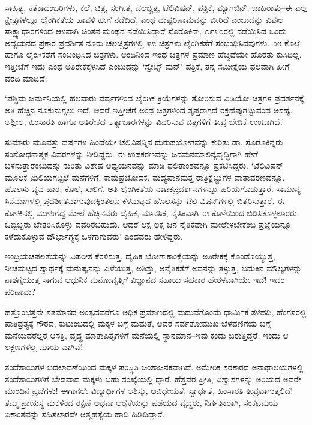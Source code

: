 ಸಾಹಿತ್ಯ, ಕತೆಕಾದಂಬರಿಗಳು, ಕಲೆ, ಚಿತ್ರ, ಸಂಗೀತ, ಚಲಚ್ಚಿತ್ರ, ಟೆಲಿವಿಷನ್, ಪತ್ರಿಕೆ, ಮ್ಯಾಗಜಿನ್, ಜಾಹಿರಾತು–ಈ ಎಲ್ಲ ಕ್ಷೇತ್ರಗಳಲ್ಲೂ ಲೈಂಗಿಕತೆಯ ಹಾವಳಿ ಹೇಗೆ ನಡೆದಿದೆ, ಎಂಥ ದುಷ್ಪರಿಣಾಮವನ್ನು ಬೀರಿದೆ ಎಂಬುದನ್ನು ವಿಪುಲ ಸಾಕ್ಷ್ಯಾಧಾರಗಳಿಂದ ಆಳವಾಗಿ ಚಿಂತನ ಮಂಥನ ನಡೆಯಿಸಿದ್ದಾರೆ ಸೊರೊಕಿನ್. ೧೯೩೦ರಲ್ಲಿ ನಡೆಯಿಸಿದ ಒಂದು ಅಧ್ಯಯನದ ಪ್ರಕಾರ ಪ್ರದರ್ಶಿತ ನೂರು ಚಲಚ್ಚಿತ್ರಗಳಲ್ಲಿ ೪೫ ಚಿತ್ರಗಳು ಲೈಂಗಿಕತೆಗೆ ಸಂಬಂಧಿಸಿದವುಗಳು. ೨೮ ಕೊಲೆ ಹಾಗೂ ಲೈಂಗಿಕತೆಗೆ ಸಂಬಂಧಿಸಿದ ಚಿತ್ರಗಳು. ಅಂದಿನಿಂದ ಇಂಥ ಚಿತ್ರಗಳ ಪ್ರಮಾಣ ಹೆಚ್ಚಿದೆಯೇ ಹೊರತು ಕುಸಿದಿಲ್ಲ. ಇತ್ತೀಚೆಗೆ ಇದು ಎಂಥ ಅತಿರೇಕಕ್ಕೆಳಸಿದೆ ಎಂಬುದನ್ನು ‘ಸ್ವೇಟ್ಸ್ ಮನ್​’ ಪತ್ರಿಕೆ, ತನ್ನ ಸಮೀಕ್ಷೆಯ ಫಲವಾಗಿ ಹೀಗೆ ವರದಿ ಮಾಡಿದೆ:

‘ಪಶ್ಚಿಮ ಜರ್ಮನಿಯಲ್ಲಿ ಹಲವಾರು ವರ್ಷಗಳಿಂದ ಲೈಂಗಿಕ ಕ್ರಿಯೆಗಳನ್ನು ತೋರಿಸುವ ವಿಡಿಯೋ ಚಿತ್ರಗಳ ಪ್ರದರ್ಶನಕ್ಕೆ ಅತಿ ಹೆಚ್ಚಿನ ನೂಕುನುಗ್ಗಲು ಇದೆ. ಆದರೆ ಇತ್ತೀಚೆಗೆ ಅಂಥ ಚಿತ್ರಗಳಿಂದ ತೃಪ್ತರಾಗದೆ ರಕ್ತಹೆಪ್ಪುಗಟ್ಟುವಂಥ ಅಸಹ್ಯ, ಅಶ್ಲೀಲ, ಹಿಂಸಾರತಿ ಹಾಗೂ ಅತಿರೇಕದ ಅತ್ಯಾಚಾರಗಳನ್ನು ವಿವರಿಸುವ ಚಿತ್ರಗಳಿಗೆ ತೀವ್ರ ಬೇಡಿಕೆ ಉಂಟಾಗಿದೆ.’

ಸುಮಾರು ಮೂವತ್ತು ವರ್ಷಗಳ ಹಿಂದೆಯೇ ಟೆಲಿವಿಷನ್ನಿನ ದುರುಪಯೋಗವನ್ನು ಕುರಿತು ಡಾ. ಸೊರೊಕಿನ್ನರು ಸಂಶೋಧನಾತ್ಮಕ ವಿವರಗಳನ್ನು ನೀಡಿದ್ದರು. ಈ ಉಪಕರಣವನ್ನು ಜನಮನಮಾಲಿನ್ಯವೃದ್ಧಿಗಾಗಿ ಹೇಗೆ ಬಳಸುತ್ತಾರೆಂಬುದನ್ನು ಕುರಿತು ವಿಶೇಷ ಅಧ್ಯಯನವನ್ನು ಮಾಡಿ ಫಲಿತಾಂಶವನ್ನೂ ಪ್ರಕಟಿಸಿದ್ದರು. ‘ಟೆಲಿವಿಷನ್ ಮೂಲಕ ಮಿಲಿಯಗಟ್ಟಲೆ ಮನೆಗಳಿಗೆ, ಕಾಮಪ್ರಚೋದಕ, ಮದ್ಯಪಾನಮತ್ತ ರಾತ್ರಿಕ್ಲಬ್ಬುಗಳ ವಾತಾವರಣವನ್ನೂ, ಹೊಲಸು ವ್ಯವ ಹಾರ, ಕೊಲೆ, ಸುಲಿಗೆ, ಅತಿ ಲೈಂಗಿಕತೆಯ ನಾಟಕಪ್ರದರ್ಶನಗಳನ್ನೂ ಹರಿಯಗೊಡುತ್ತಾರೆ. ಸಾಮಾನ್ಯ ಸಿನೆಮಾಗಳಲ್ಲಿ ಪ್ರದರ್ಶಿತವಾಗುವುದಕ್ಕಿಂತಲೂ ಕೆಳಮಟ್ಟದ ಹೊಲಸನ್ನು ಟೆಲಿ ವಿಷನ್​ಗಳಲ್ಲಿ ಬಿತ್ತರಿಸುತ್ತಾರೆ. ಈ ಕೊಳಕಿನಲ್ಲಿ ಮುಳುಗೆದ್ದ ಮೇಲೆ ಹೆಚ್ಚಿನವರು ದೈಹಿಕ, ಮಾನಸಿಕ, ನೈತಿಕವಾಗಿ ಈ ಕೊಳೆಯಿಂದ ಬಿಡಿಸಿಕೊಳ್ಳಲಾರರು. ಒಬ್ಬಿಬ್ಬರು ಚೇತರಿಸಿಕೊಳ್ಳು ವವರಿರಬಹುದು. ಆದರೆ ಲಕ್ಷ ಲಕ್ಷ ಜನ ನೈತಿಕವಾಗಿ ಮೇಲೇಳಬೇಕೆಂಬ ಪ್ರಜ್ಞೆಯನ್ನೂ ಕಳೆದುಕೊಳ್ಳುವ ದೌರ್ಭಾಗ್ಯಕ್ಕೆ ಒಳಗಾಗುವರು’ ಎಂದವರು ಹೇಳಿದ್ದರು.

ಇಂದ್ರಿಯಚಪಲತೆಯನ್ನು ವಿಪರೀತ ಕೆರಳಿಸುತ್ತ, ದೈಹಿಕ ಭೋಗಾಕಾಂಕ್ಷೆಯನ್ನು ಅತಿರೇಕಕ್ಕೆ ಕೊಂಡೊಯ್ಯುತ್ತ, ನೀಚಮಟ್ಟದ ಸ್ವಾರ್ಥಕ್ಕೆ ಮನುಷ್ಯನನ್ನು ಎಳೆಯುತ್ತ, ಅಶಿಸ್ತು, ಅನೈತಿಕತೆಗೆ ಅವನನ್ನು ತಳ್ಳುತ್ತ, ಬದುಕಿನ ಮೌಲ್ಯಗಳನ್ನು ನಾಶಗೈಯುತ್ತ ಸಾಗುವ ಆಧುನಿಕ ಮನೋವೃತ್ತಿಗೆ ವಿಜ್ಞಾನದ ಸಹಾಯ ಸಹಕಾರ ಹೇರಳವಾಗಿಯೇ ಇದೆ! ಇದರ ಪರಿಣಾಮ?

ಹತ್ತೊಂಭತ್ತನೇ ಶತಮಾನದ ಅಂತ್ಯದವರೆಗೂ ಅಧಿಕ ಪ್ರಮಾಣದಲ್ಲಿ ಮದುವೆಗೊಂದು ಧಾರ್ಮಿಕ ತಳಹದಿ, ಹೆಂಗಸರಲ್ಲಿ ಪಾತಿವ್ರತ್ಯಕ್ಕೆ ಗೌರವ, ಕುಟುಂಬದಲ್ಲಿ ಮಕ್ಕಳ ಬಗ್ಗೆ ಮಮತೆ, ಅವರ ಸರ್ವತೋಮುಖ ಬೆಳವಣಿಗೆಯ ಬಗ್ಗೆ ಮನೆಯವರೆಲ್ಲರ ಆಸಕ್ತಿ, ವೃದ್ಧ ಮಾತಾಪಿತೃಗಳಿಗೆ ಮನೆಯಲ್ಲಿ ಸ್ಥಾನಮಾನ–ಇವು ಕಂಡು ಬರುತ್ತಿದ್ದರೆ, ಇಂದು ಆ ಲಕ್ಷಣಗಳೆಲ್ಲ ಮಾಯ ವಾಗಿವೆ!

ತಂದೆತಾಯಿಗಳ ಬದಲಾವಣೆಯಿಂದ ಮಕ್ಕಳ ಪರಿಸ್ಥಿತಿ ಚಿಂತಾಜನಕವಾಗಿದೆ. ಅಮೇರಿಕ ಸರಕಾರದ ಅನಾಥಾಲಯಗಳಲ್ಲಿ ತಂದೆತಾಯಿಗಳಿಗೆ ಬೇಡವಾದ ಮಕ್ಕಳು ಬಹು ಸಂಖ್ಯೆಯಲ್ಲಿ ದ್ದಾರೆ. ಹೆತ್ತವರ ಪ್ರೀತಿ, ವಿಶ್ವಾಸಗಳನ್ನು ಅರಿಯದ ಅವರೇ ಮುಂದಿನ ಪ್ರಜೆಗಳು! ಈಗಾಗಲೇ ವಿದ್ಯಾರ್ಥಿಗಳ ಅಶಿಸ್ತು, ಅವಿಧೇಯತೆ, ಸ್ವಾರ್ಥತೆ, ಹಿಂಸಾರತಿ ತೀವ್ರವಾಗುತ್ತಲಿದೆ! ತಮ್ಮ ಪ್ರಾಯಸ್ಥ ಮಕ್ಕಳಿಂದ ರಕ್ಷಣೆ ಅಥವಾ ಆರೈಕೆಯನ್ನು ಪಡೆಯದ ವೃದ್ಧರು, ನಿರ್ಗತಿಕರಾಗಿ, ಸಂಕಟಮಯ ಏಕಾಂತವನ್ನು ಸಹಿಸಲಾರದೇ ಆತ್ಮಹತ್ಯೆಯ ಹಾದಿ ಹಿಡಿದಿದ್ದಾರೆ.

